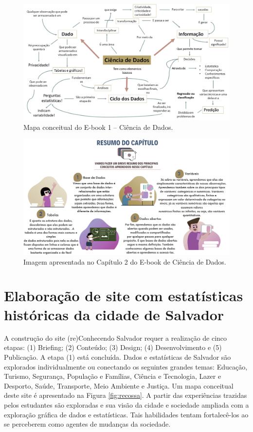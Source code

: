 \documentclass[
]{book}
\begin{document}
\begin{figure}
\includegraphics[width=18.07in]{images/image115} \caption{Mapa conceitual do E-book 1 – Ciência de Dados.}\label{fig:ebookcd}
\end{figure}

\begin{figure}
\includegraphics[width=18.97in]{images/image116} \caption{Imagem apresentada no Capítulo 2 do E-book de Ciência de Dados.}\label{fig:ebookprotag}
\end{figure}

\hypertarget{ressa}{%
\chapter{Elaboração de site com estatísticas históricas da cidade de Salvador}\label{ressa}}

A construção do site (re)Conhecendo Salvador requer a realização de cinco etapas: (1) Briefing; (2) Conteúdo; (3) Design; (4) Desenvolvimento e (5) Publicação. A etapa (1) está concluída. Dados e estatísticas de Salvador são explorados individualmente ou conectando os seguintes grandes temas: Educação, Turismo, Segurança, População e Famílias, Ciência e Tecnologia, Lazer e Desporto, Saúde, Transporte, Meio Ambiente e Justiça. Um mapa conceitual deste site é apresentado na Figura \ref{fig:recossa}. A partir das experiências trazidas pelos estudantes são exploradas e sua visão da cidade e sociedade ampliada com a exploração gráfica de dados e estatísticas. Tais habilidades tentam fortalecê-los ao se perceberem como agentes de mudanças da sociedade.
\end{document}
